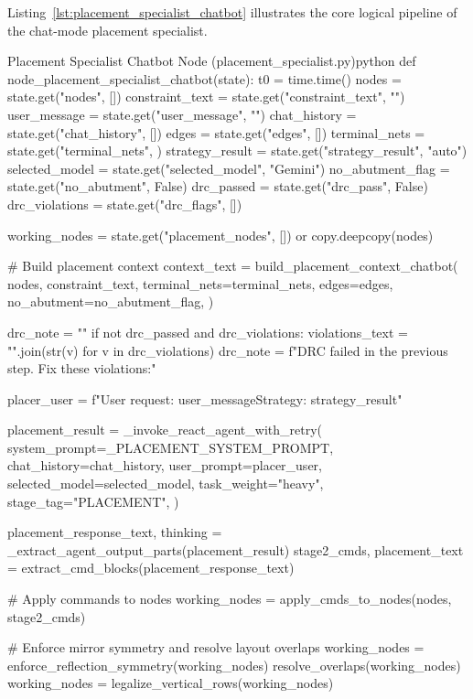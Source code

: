 Listing~\ref{lst:placement_specialist_chatbot} illustrates the core logical pipeline of the chat-mode placement specialist.

\begin{thesiscode}{Placement Specialist Chatbot Node (placement\_specialist.py)\label{lst:placement_specialist_chatbot}}{python}
def node_placement_specialist_chatbot(state):
    t0 = time.time()
    nodes            = state.get("nodes", [])
    constraint_text  = state.get("constraint_text", "")
    user_message     = state.get("user_message", "")
    chat_history     = state.get("chat_history", [])
    edges            = state.get("edges", [])
    terminal_nets    = state.get("terminal_nets", {})
    strategy_result  = state.get("strategy_result", "auto")
    selected_model   = state.get("selected_model", "Gemini")
    no_abutment_flag = state.get("no_abutment", False)
    drc_passed       = state.get("drc_pass", False)
    drc_violations   = state.get("drc_flags", [])

    working_nodes = state.get("placement_nodes", []) or copy.deepcopy(nodes)

    # Build placement context
    context_text = build_placement_context_chatbot(
        nodes, constraint_text, terminal_nets=terminal_nets, 
        edges=edges, no_abutment=no_abutment_flag,
    )

    drc_note = ""
    if not drc_passed and drc_violations:
        violations_text = "\n".join(str(v) for v in drc_violations)
        drc_note = f"DRC failed in the previous step. Fix these violations:\n\n"

    placer_user = f"User request: {user_message}\n\nSelected Strategy: {strategy_result}\n{}"
    
    placement_result = _invoke_react_agent_with_retry(
        system_prompt=_PLACEMENT_SYSTEM_PROMPT, chat_history=chat_history,
        user_prompt=placer_user, selected_model=selected_model,
        task_weight="heavy", stage_tag="PLACEMENT",
    )
    
    placement_response_text, thinking = _extract_agent_output_parts(placement_result)
    stage2_cmds, placement_text = extract_cmd_blocks(placement_response_text)

    # Apply commands to nodes
    working_nodes = apply_cmds_to_nodes(nodes, stage2_cmds)
    
    # Enforce mirror symmetry and resolve layout overlaps
    working_nodes = enforce_reflection_symmetry(working_nodes)
    resolve_overlaps(working_nodes)
    working_nodes = legalize_vertical_rows(working_nodes)


\end{thesiscode}
